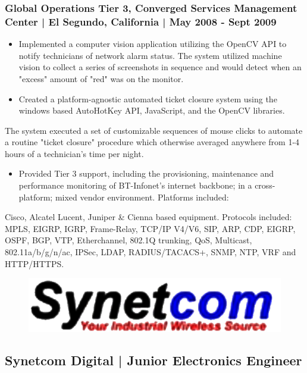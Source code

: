 \documentclass[letter,10pt]{article}
\begin{document}
\subsubsection*{Global Operations Tier 3, Converged Services Management Center | El Segundo, California | May 2008 - Sept 2009}
\label{sec:orgc0d0243}
\begin{itemize}
\item Implemented a computer vision application utilizing the OpenCV API to notify technicians of network alarm status. The system utilized machine vision to collect a series of screenshots in sequence and would detect when an "excess" amount of "red" was on the monitor.
\item Created a platform-agnostic automated ticket closure system using the windows based AutoHotKey API, JavaScript, and the OpenCV libraries.
\end{itemize}
The system executed a set of customizable sequences of mouse clicks to automate a routine "ticket closure" procedure which otherwise averaged anywhere from 1-4 hours of a technician's time per night. 
\begin{itemize}
\item Provided Tier 3 support, including the provisioning, maintenance and performance monitoring of BT-Infonet's internet backbone; in a cross-platform; mixed vendor environment. Platforms included:
\end{itemize}
Cisco, Alcatel Lucent, Juniper \& Cienna based equipment. Protocols included: MPLS, EIGRP, IGRP, Frame-Relay, TCP/IP V4/V6, SIP, ARP, CDP, EIGRP, OSPF, BGP, VTP, Etherchannel, 802.1Q trunking, QoS, Multicast, 802.11a/b/g/n/ac, IPSec, LDAP, RADIUS/TACACS+, SNMP, NTP, VRF and HTTP/HTTPS.




\begin{figure}
\includegraphics[width=0.8\linewidth]{./img/50p_cr_synetcom.jpg}
\end{figure}

\subsection*{Synetcom Digital | Junior Electronics Engineer}
\label{sec:org36b1d87}
\end{document}
